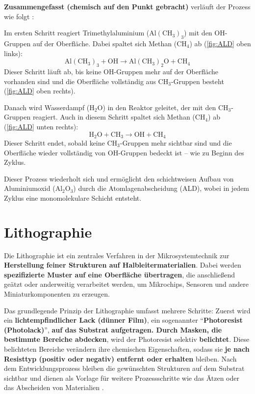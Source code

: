 \documentclass{article} %
\begin{document}
\textbf{Zusammengefasst (chemisch auf den Punkt gebracht)} verläuft der Prozess wie folgt \cite{keplinger2024CVD}:

Im ersten Schritt reagiert Trimethylaluminium (\(\mathrm{Al(CH_3)_3}\)) mit den OH-Gruppen auf der Oberfläche. Dabei spaltet sich Methan ($\mathrm{CH_4}$) ab (\autoref{fig:ALD} oben links):
$$
\mathrm{Al(CH_3)_3} + \mathrm{OH} \rightarrow \mathrm{Al(CH_3)_2O} + \mathrm{CH_4}
$$
Dieser Schritt läuft ab, bis keine OH-Gruppen mehr auf der Oberfläche vorhanden sind und die Oberfläche vollständig aus \(\mathrm{CH_3}\)-Gruppen besteht (\autoref{fig:ALD} oben rechts).

Danach wird Wasserdampf (\(\mathrm{H_2O}\)) in den Reaktor geleitet, der mit den \(\mathrm{CH_3}\)-Gruppen reagiert. Auch in diesem Schritt spaltet sich Methan ($\mathrm{CH_4}$) ab (\autoref{fig:ALD} unten rechts):
$$
\mathrm{H_2O} + \mathrm{CH_3} \rightarrow \mathrm{OH} + \mathrm{CH_4}
$$
Dieser Schritt endet, sobald keine \(\mathrm{CH_3}\)-Gruppen mehr sichtbar sind und die Oberfläche wieder vollständig von \(\mathrm{OH}\)-Gruppen bedeckt ist -- wie zu Beginn des Zyklus.

Dieser Prozess wiederholt sich und ermöglicht den schichtweisen Aufbau von Aluminiumoxid (\(\mathrm{Al_2O_3}\)) durch die Atomlagenabscheidung (ALD), wobei in jedem Zyklus eine monomolekulare Schicht entsteht.





\vspace{1em}

\section{Lithographie}

Die Lithographie ist ein zentrales Verfahren in der Mikrosystemtechnik zur \textbf{Herstellung feiner Strukturen auf Halbleitermaterialien}. Dabei werden \textbf{spezifizierte Muster auf eine Oberfläche übertragen}, die anschließend geätzt oder anderweitig verarbeitet werden, um Mikrochips, Sensoren und andere Miniaturkomponenten zu erzeugen.

\vspace{1em}

Das grundlegende Prinzip der Lithographie umfasst mehrere Schritte: Zuerst wird ein \textbf{lichtempfindlicher Lack (dünner Film)}, ein sogenannter ``\textbf{Photoresist (Photolack)}'', \textbf{auf das Substrat aufgetragen. Durch Masken, die bestimmte Bereiche abdecken}, wird der Photoresist selektiv \textbf{belichtet}. Diese belichteten Bereiche verändern ihre chemischen Eigenschaften, sodass sie \textbf{je nach Resisttyp (positiv oder negativ) entfernt oder erhalten} bleiben. Nach dem Entwicklungsprozess bleiben die gewünschten Strukturen auf dem Substrat sichtbar und dienen als Vorlage für weitere Prozessschritte wie das Ätzen oder das Abscheiden von Materialien \cite{madou2002}.
\end{document}
